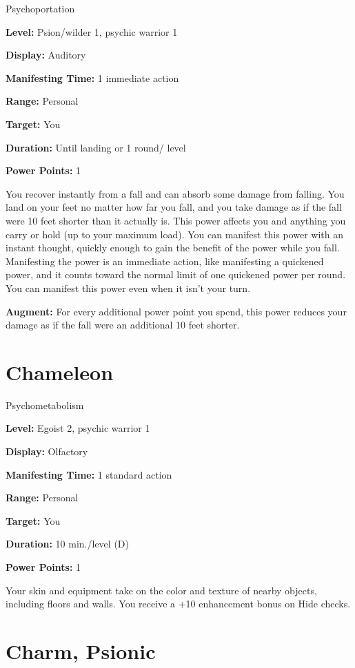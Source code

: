 \documentclass{article}
\begin{document}
Psychoportation

\textbf{Level:} Psion/wilder 1, psychic warrior 1

\textbf{Display:} Auditory

\textbf{Manifesting Time:} 1 immediate action

\textbf{Range:} Personal

\textbf{Target:} You

\textbf{Duration:} Until landing or 1 round/ level

\textbf{Power Points:} 1

You recover instantly from a fall and can absorb some damage from falling. You 
land on your feet no matter how far you fall, and you take damage as if the fall 
were 10 feet shorter than it actually is. This power affects you and anything you 
carry or hold (up to your maximum load). You can manifest this power with an instant 
thought, quickly enough to gain the benefit of the power while you fall. Manifesting 
the power is an immediate action, like manifesting a quickened power, and it counts 
toward the normal limit of one quickened power per round. You can manifest this 
power even when it isn't your turn.

\textbf{Augment:} For every additional power point you spend, this power reduces 
your damage as if the fall were an additional 10 feet shorter.

\vspace{12pt}
\section*{Chameleon}

Psychometabolism

\textbf{Level:} Egoist 2, psychic warrior 1

\textbf{Display:} Olfactory

\textbf{Manifesting Time:} 1 standard action

\textbf{Range:} Personal

\textbf{Target:} You

\textbf{Duration:} 10 min./level (D)

\textbf{Power Points:} 1

Your skin and equipment take on the color and texture of nearby objects, including 
floors and walls. You receive a +10 enhancement bonus on Hide checks.

\vspace{12pt}
\section*{Charm, Psionic}
\end{document}
